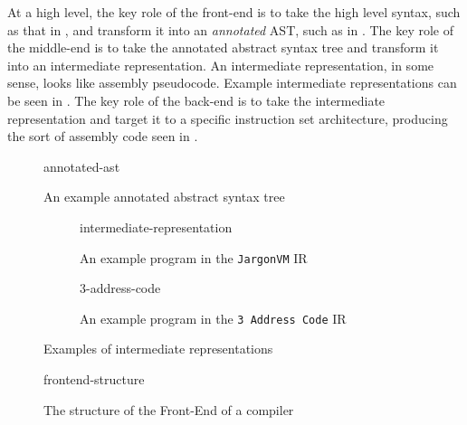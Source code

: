 At a high level, the key role of the front-end is to take the high level syntax, such as that in , and transform it into an \textit{annotated} AST, such as in . The key role of the middle-end is to take the annotated abstract syntax tree and transform it into an intermediate representation. An intermediate representation, in some sense, looks like assembly pseudocode. Example intermediate representations can be seen in . The key role of the back-end is to take the intermediate representation and target it to a specific instruction set architecture, producing the sort of assembly code seen in .

\begin{figure}[H]
    \centering
    {annotated-ast}
    \caption{An example annotated abstract syntax tree}
    \label{fig:example-annotated-ast}
\end{figure}

\begin{figure}
    \begin{subfigure}{0.5\textwidth}
        \centering
        {intermediate-representation}
        \caption{An example program in the \texttt{JargonVM} IR}
        \label{fig:example-ir-jargon}
    \end{subfigure}
    \begin{subfigure}{0.5\textwidth}
        \centering
        {3-address-code}
        \caption{An example program in the \texttt{3 Address Code} IR}
        \label{fig:example-ir-3ac}
    \end{subfigure}
    \caption{Examples of intermediate representations}
    \label{fig:example-ir}
\end{figure}

\begin{figure}[h]
    \centering
    {frontend-structure}
    \caption{The structure of the Front-End of a compiler}
    \label{fig:frontend-label}
\end{figure}


